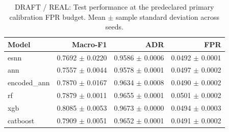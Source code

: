 \begin{table}[t]
\centering
\caption{DRAFT / REAL: Test performance at the predeclared primary calibration FPR budget. Mean $\pm$ sample standard deviation across seeds.}
\label{tab:main}
\begin{tabular}{lrrr}
\toprule
Model & Macro-F1 & ADR & FPR \\
\midrule
esnn & 0.7692 $\pm$ 0.0220 & 0.9586 $\pm$ 0.0006 & 0.0492 $\pm$ 0.0001 \\
ann & 0.7557 $\pm$ 0.0044 & 0.9578 $\pm$ 0.0001 & 0.0497 $\pm$ 0.0002 \\
encoded\_ann & 0.7870 $\pm$ 0.0167 & 0.9634 $\pm$ 0.0008 & 0.0490 $\pm$ 0.0002 \\
rf & 0.7879 $\pm$ 0.0011 & 0.9655 $\pm$ 0.0001 & 0.0501 $\pm$ 0.0002 \\
xgb & 0.8085 $\pm$ 0.0053 & 0.9673 $\pm$ 0.0000 & 0.0494 $\pm$ 0.0003 \\
catboost & 0.7909 $\pm$ 0.0051 & 0.9652 $\pm$ 0.0001 & 0.0491 $\pm$ 0.0002 \\
\bottomrule
\end{tabular}
\end{table}
